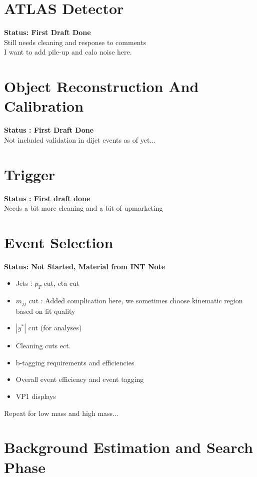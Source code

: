 \section{ATLAS Detector}

\textbf{Status: First Draft Done}\\
\noindent
Still needs cleaning and response to comments\\
I want to add pile-up and calo noise here.\\
\noindent

\section{Object Reconstruction And Calibration}

\textbf{Status : First Draft Done}\\
\noindent
Not included validation in dijet events as of yet...\\
  

  \newpage
\section{Trigger}

\textbf{Status : First draft done}\\
\noindent
Needs a bit more cleaning and a bit of upmarketing

\section{Event Selection}

\textbf{Status: Not Started, Material from INT Note}

  \begin{itemize}
  \item{Jets : $p_{T}$ cut, eta cut}
  \item{$m_{jj}$ cut : Added complication here, we sometimes choose kinematic region based on fit quality}
  \item{$|y^*|$ cut (for analyses)}
  \item{Cleaning cuts ect.}
  \item{b-tagging requirements and efficiencies}
  \item{Overall event efficiency and event tagging}
  \item{VP1 displays}
  \end{itemize}

 Repeat for low mass and high mass...

\section{Background Estimation and Search Phase}

